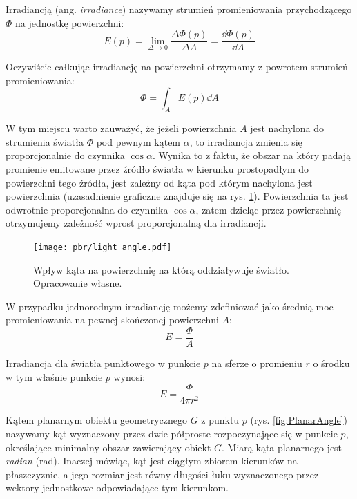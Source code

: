 \documentclass[../main.tex]{subfiles}
\begin{document}
Irradiancją (ang. \textit{irradiance}) nazywamy strumień promieniowania przychodzącego $\Phi$ na jednostkę powierzchni:
\begin{equation}
E(p) =
    \lim_{\Delta \rightarrow 0} {
        \frac{\Delta \Phi(p)}{\Delta A}
    } =
    \frac{\dd \Phi(p)}{\dd A}
\label{eq:pbr_irradiance}
\end{equation}

Oczywiście całkując irradiancję na powierzchni otrzymamy z powrotem strumień promieniowania:
\begin{equation}
\Phi = \int_{A} {
    E(p)
    \dd A
}
\label{eq:pbr_irr_to_flux}
\end{equation}

W tym miejscu warto zauważyć, że jeżeli powierzchnia $A$ jest nachylona do strumienia światła $\Phi$ pod pewnym kątem $\alpha$, to irradiancja zmienia się proporcjonalnie do czynnika $\cos \alpha$. Wynika to z faktu, że obszar na który padają promienie emitowane przez źródło światła w kierunku prostopadłym do powierzchni tego źródła, jest zależny od kąta pod którym nachylona jest powierzchnia (uzasadnienie graficzne znajduje się na rys. \ref{fig:SourceLightAngle}). Powierzchnia ta jest odwrotnie proporcjonalna do czynnika $\cos \alpha$, zatem dzieląc przez powierzchnię otrzymujemy zależność wprost proporcjonalną dla irradiancji.

\begin{figure}[ht]
  \centering
  \texttt{[image: pbr/light\_angle.pdf]}
  \caption{Wpływ kąta na powierzchnię na którą oddziaływuje światło. Opracowanie własne.}
  \label{fig:SourceLightAngle}
\end{figure}

W przypadku jednorodnym irradiancję możemy zdefiniować jako średnią moc promieniowania na pewnej skończonej powierzchni $A$:
\begin{equation}
    E = \frac{\Phi}{A}
\label{eq:pbr_irr_as_mean}
\end{equation}

\begin{example}
  Irradiancja dla światła punktowego w punkcie $p$ na sferze o
  promieniu $r$ o środku w tym właśnie punkcie $p$ wynosi:
  \[
    E = \frac{\Phi}{4 \pi r^2}
  \]
\end{example}

Kątem planarnym obiektu geometrycznego $G$ z punktu $p$ (rys. \ref{fig:PlanarAngle}) nazywamy kąt wyznaczony przez dwie półproste rozpoczynające się w punkcie $p$, określające minimalny obszar zawierający obiekt $G$. Miarą kąta planarnego jest \textit{radian} (\si{\radian}). Inaczej mówiąc, kąt jest ciągłym zbiorem kierunków na płaszczyznie, a jego rozmiar jest równy długości łuku wyznaczonego przez wektory jednostkowe odpowiadające tym kierunkom.
\end{document}
